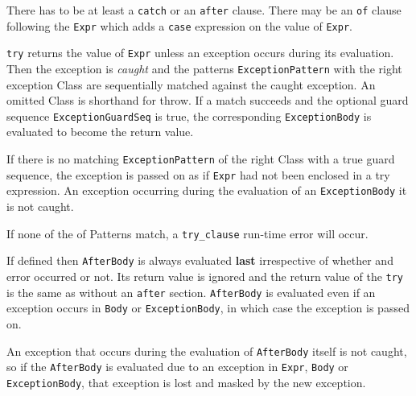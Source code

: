 There has to be at least a \texttt{catch} or an \texttt{after}
clause. There may be an \texttt{of} clause following the \texttt{Expr}
which adds a \texttt{case} expression on the value of \texttt{Expr}.

\texttt{try} returns the value of \texttt{Expr} unless an exception
occurs during its evaluation. Then the exception is \textit{caught}
and the patterns \texttt{ExceptionPattern} with the right exception
Class are sequentially matched against the caught exception. An
omitted Class is shorthand for throw. If a match succeeds and the
optional guard sequence \texttt{ExceptionGuardSeq} is true, the
corresponding \texttt{ExceptionBody} is evaluated to become the return
value.

If there is no matching \texttt{ExceptionPattern} of the right Class
with a true guard sequence, the exception is passed on as if
\texttt{Expr} had not been enclosed in a try expression. An exception
occurring during the evaluation of an \texttt{ExceptionBody} it is not
caught.

If none of the of Patterns match, a \texttt{try\_clause} run-time
error will occur.

If defined then \texttt{AfterBody} is always evaluated \textbf{last}
irrespective of whether and error occurred or not. Its return value is
ignored and the return value of the \texttt{try} is the same as
without an \texttt{after} section. \texttt{AfterBody} is evaluated
even if an exception occurs in \texttt{Body} or
\texttt{ExceptionBody}, in which case the exception is passed on.


An exception that occurs during the evaluation of \texttt{AfterBody}
itself is not caught, so if the \texttt{AfterBody} is evaluated due to
an exception in \texttt{Expr}, \texttt{Body} or
\texttt{ExceptionBody}, that exception is lost and masked by the new
exception.